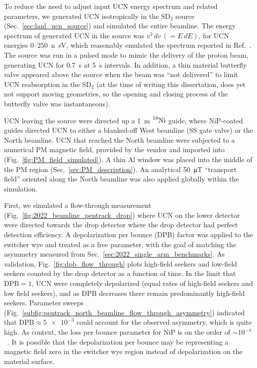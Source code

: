 To reduce the need to adjust input UCN energy spectrum and related parameters, we generated UCN isotropically in the SD$_2$ source (Sec.~\ref{sec:lanl_ucn_source}) and simulated the entire beamline. The energy spectrum of generated UCN in the source was $v^3\,dv\,(=E\,dE)$, for UCN energies 0--\qty{250}{n\eV}, which reasonably emulated the spectrum reported in Ref.~\cite{saunders_performance_2013}. The source was run in a pulsed mode to mimic the delivery of the proton beam, generating UCN for \qty{0.7}{s} at \qty{5}{s} intervals. In addition, a thin material butterfly valve appeared above the source when the beam was ``not delivered'' to limit UCN reabsorption in the SD$_2$ (at the time of writing this dissertation, \pentrack does yet not support moving geometries, so the opening and closing process of the butterfly valve was instantaneous).

UCN leaving the source were directed up a \qty{1}{m} $\ce{^{58}Ni}$ guide, where NiP-coated guides directed UCN to either a blanked-off West beamline (SS gate valve) or the North beamline. UCN that reached the North beamline were subjected to a numerical PM magnetic field, provided by the vendor and imported into \pentrack (Fig.~\ref{fig:PM_field_simulated}). A thin Al window was placed into the middle of the PM region (Sec.~\ref{sec:PM_description}). An analytical \qty{50}{\micro T} ``transport field'' oriented along the North beamline was also applied globally within the simulation.

First, we simulated a flow-through measurement (Fig.~\ref{fig:2022_beamline_pentrack_drop}) where UCN on the lower detector were directed towards the drop detector where the drop detector had perfect detection efficiency. A depolarization per bounce (DPB) factor was applied to the switcher wye and treated as a free parameter, with the goal of matching the asymmetry measured from Sec.~\ref{sec:2022_single_arm_benchmarks}. As validation, Fig.~\ref{fig:dpb_flow_through} plots high-field seekers and low-field seekers counted by the drop detector as a function of time. In the limit that $\text{DPB}=1$, UCN were completely depolarized (equal rates of high-field seekers and low field seekers), and as DPB decreases there remain predominantly high-field seekers. Parameter sweeps (Fig.~\ref{subfig:pentrack_north_beamline_flow_through_asymmetry}) indicated that $\text{DPB}\approx \num{5e-3}$ could account for the observed asymmetry, which is quite high. As context, the loss per bounce parameter for NiP is on the order of $\sim 10^{-4}$~\cite{pattie_jr_evaluation_2017}. It is possible that the depolarization per bounce may be representing a magnetic field zero in the switcher wye region instead of depolarization on the material surface.

